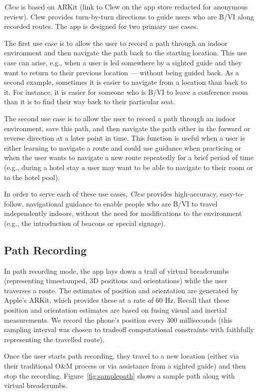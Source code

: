 \documentclass[chi_draft]{sigchi}
\newcommand{\BVI}{B/VI\xspace}
\newcommand{\OM}{O\&M\xspace}
\begin{document}
\emph{Clew} is based on ARKit (link to Clew on the app store redacted for anonymous review).  Clew provides turn-by-turn directions to guide users who are \BVI along recorded routes.  The app is designed for two primary use cases.

The first use case is to allow the user to record a path through an indoor environment and then navigate the path back to the starting location.  This use case can arise, e.g., when a user is led somewhere by a sighted guide and they want to return to their previous location --- without being guided back.  As a second example, sometimes it is easier to navigate from a location than back to it.  For instance, it is easier for someone who is \BVI to leave a conference room than it is to find their way back to their particular seat.

The second use case is to allow the user to record a path through an indoor environment, save this path, and then navigate the path either in the forward or reverse direction at a later point in time.  This function is useful when a user is either learning to navigate a route and could use guidance when practicing or when the user wants to navigate a new route repeatedly for a brief period of time (e.g., during a hotel stay a user may want to be able to navigate to their room or to the hotel pool).

In order to serve each of these use cases, \emph{Clew} provides high-accuracy, easy-to-follow, navigational guidance to enable people who are \BVI to travel independently indoors, without the need for modifications to the environment (e.g., the introduction of beacons or special signage).  

\subsection{Path Recording}

In path recording mode, the app lays down a trail of virtual breadcrumbs (representing timestamped, 3D positions and orientations) while the user traverses a route.  The estimates of position and orientation are generated by Apple's ARKit, which provides these at a rate of 60 Hz.  Recall that these position and orientation estimates are based on fusing visual and inertial measurements.  We record the phone's position every $300$ milliseconds (this sampling interval was chosen to tradeoff computational constraints with faithfully representing the travelled route).

Once the user starts path recording, they travel to a new location (either via their traditional \OM process or via assistance from a sighted guide) and then stop the recording.  Figure~\ref{fig:samplepath} shows a sample path along with virtual breadcrumbs.
%
\end{document}
